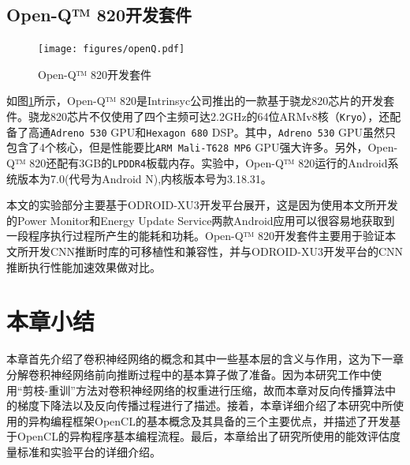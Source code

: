\subsection{Open-Q™ 820开发套件}
\label{chapter:chapter2-5-2}

\begin{figure}[htbp]
    \begin{center}
    \texttt{[image: figures/openQ.pdf]}
    \end{center}
    \caption{Open-Q™ 820开发套件}\label{figure:figureopenQ}
\end{figure}

如图\ref{figure:figureopenQ}所示，Open-Q™ 820是Intrinsyc公司推出的一款基于骁龙820芯片的开发套件。骁龙820芯片不仅使用了四个主频可达2.2GHz的64位ARMv8核（\texttt{Kryo}），还配备了高通\texttt{Adreno 530} GPU和\texttt{Hexagon 680} DSP。其中，\texttt{Adreno 530} GPU虽然只包含了4个核心，但是性能要比\texttt{ARM Mali-T628 MP6} GPU强大许多。另外，Open-Q™ 820还配有3GB的\texttt{LPDDR4}板载内存。实验中，Open-Q™ 820运行的Android系统版本为7.0(代号为Android N),内核版本号为3.18.31。

本文的实验部分主要基于ODROID-XU3开发平台展开，这是因为使用本文所开发的Power Monitor和Energy Update Service两款Android应用可以很容易地获取到一段程序执行过程所产生的能耗和功耗。Open-Q™ 820开发套件主要用于验证本文所开发CNN推断时库的可移植性和兼容性，并与ODROID-XU3开发平台的CNN推断执行性能加速效果做对比。

\section{本章小结}

本章首先介绍了卷积神经网络的概念和其中一些基本层的含义与作用，这为下一章分解卷积神经网络前向推断过程中的基本算子做了准备。因为本研究工作中使用“剪枝-重训”方法对卷积神经网络的权重进行压缩，故而本章对反向传播算法中的梯度下降法以及反向传播过程进行了描述。接着，本章详细介绍了本研究中所使用的异构编程框架OpenCL的基本概念及其具备的三个主要优点，并描述了开发基于OpenCL的异构程序基本编程流程。最后，本章给出了研究所使用的能效评估度量标准和实验平台的详细介绍。

\cleardoublepage 